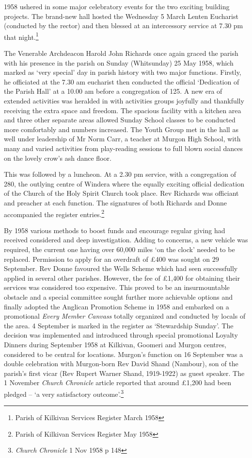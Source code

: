 1958 ushered in some major celebratory events for the two exciting building projects. The brand-new hall hosted the Wednesday 5 March Lenten Eucharist (conducted by the rector) and then blessed at an intercessory service at 7.30 pm that night.\footnote{Parish of Kilkivan Services Register March 1958}

The Venerable Archdeacon Harold John Richards once again graced the parish with his presence in the parish on Sunday (Whitsunday) 25 May 1958, which marked as `very special' day in parish history with two major functions. Firstly, he officiated at the 7.30 am eucharist then conducted the official `Dedication of the Parish Hall' at a 10.00 am before a congregation of 125. A new era of extended activities was heralded in with activities groups joyfully and thankfully receiving the extra space and freedom. The spacious facility with a kitchen area and three other separate areas allowed Sunday School classes to be conducted more comfortably and numbers increased. The Youth Group met in the hall as well under leadership of Mr Norm Carr, a teacher at Murgon High School, with many and varied activities from play-reading sessions to full blown social dances on the lovely crow's ash dance floor.

This was followed by a luncheon. At a 2.30 pm service, with a congregation of 280, the outlying centre of Windera where the equally exciting official dedication of the Church of the Holy Spirit Church took place. Rev Richards was officiant and preacher at each function. The signatures of both Richards and Donne accompanied the register entries.\footnote{Parish of Kilkivan Services Register May 1958}

By 1958 various methods to boost funds and encourage regular giving had received considered and deep investigation. Adding to concerns, a new vehicle was required, the current one having over 60,000 miles `on the clock' needed to be replaced. Permission to apply for an overdraft of £400 was sought on 29 September. Rev Donne favoured the Wells Scheme which had seen successfully applied in several other parishes. However, the fee of £1,400 for obtaining their services was considered too expensive. This proved to be an insurmountable obstacle and a special committee sought further more achievable options and finally adopted the Anglican Promotion Scheme in 1958 and embarked on a promotional \emph{Every Member Canvass} totally organized and conducted by locals of the area. 4 September is marked in the register as `Stewardship Sunday'. The decision was implemented and introduced through special promotional Loyalty Dinners during September 1958 at Kilkivan, Goomeri and Murgon centres, considered to be central for locations. Murgon's function on 16 September was a double celebration with Murgon-born Rev David Shand (Nambour), son of the parish's first vicar (Rev Rupert Warner Shand, 1919-1922) as guest speaker. The 1 November \emph{Church Chronicle} article reported that around £1,200 had been pledged -- `a very satisfactory outcome'.\footnote{\emph{Church Chronicle} 1 Nov 1958 p 148}

